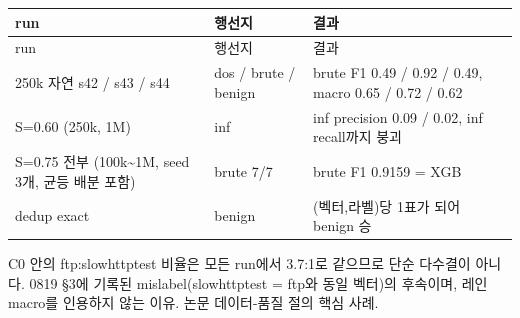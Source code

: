 \begingroup
\footnotesize
\begin{longtable}{>{\raggedright\arraybackslash}p{}>{\raggedright\arraybackslash}p{}>{\raggedright\arraybackslash}p{}}
\toprule
run & 행선지 & 결과 \\ \midrule
\endfirsthead
run & 행선지 & 결과 \\ \midrule
\endhead
{}250k 자연 s42 /\allowbreak{} s43 /\allowbreak{} s44 & dos /\allowbreak{} brute /\allowbreak{} benign & brute F1 0.49 /\allowbreak{} 0.92 /\allowbreak{} 0.49, macro 0.65 /\allowbreak{} 0.72 /\allowbreak{} 0.62 \\
{}S=\allowbreak{}0.60 (250k, 1M) & inf & inf precision 0.09 /\allowbreak{} 0.02, inf recall까지 붕괴 \\
{}S=\allowbreak{}0.75 전부 (100k\textasciitilde{}1M, seed 3개, 균등 배분 포함) & brute 7/\allowbreak{}7 & brute F1 0.9159 =\allowbreak{} XGB \\
{}dedup exact & benign & (벡터,라벨)당 1표가 되어 benign 승 \\
\bottomrule
\end{longtable}
\endgroup
C0 안의 ftp:slowhttptest 비율은 모든 run에서 3.7:1로 같으므로 단순 다수결이 아니다. 0819 §3에 기록된 mislabel(slowhttptest =\allowbreak{} ftp와 동일 벡터)의 후속이며, 레인 macro를 인용하지 않는 이유. 논문 데이터-품질 절의 핵심 사례.

